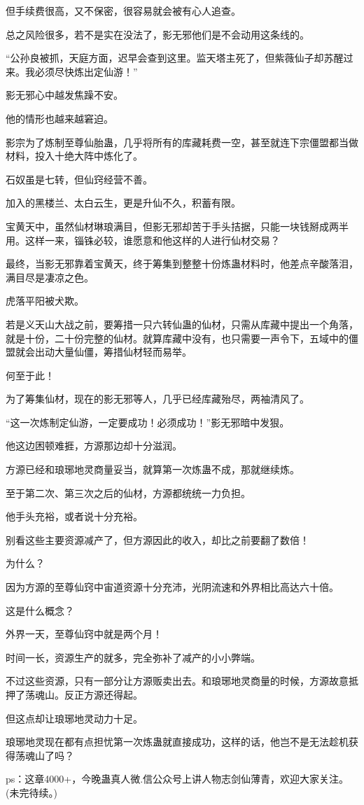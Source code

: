 \begin{this_body}
但手续费很高，又不保密，很容易就会被有心人追查。

总之风险很多，若不是实在没法了，影无邪他们是不会动用这条线的。

“公孙良被抓，天庭方面，迟早会查到这里。监天塔主死了，但紫薇仙子却苏醒过来。我必须尽快炼出定仙游！”

影无邪心中越发焦躁不安。

他的情形也越来越窘迫。

影宗为了炼制至尊仙胎蛊，几乎将所有的库藏耗费一空，甚至就连下宗僵盟都当做材料，投入十绝大阵中炼化了。

石奴虽是七转，但仙窍经营不善。

加入的黑楼兰、太白云生，更是升仙不久，积蓄有限。

宝黄天中，虽然仙材琳琅满目，但影无邪却苦于手头拮据，只能一块钱掰成两半用。这样一来，锱铢必较，谁愿意和他这样的人进行仙材交易？

最终，当影无邪靠着宝黄天，终于筹集到整整十份炼蛊材料时，他差点辛酸落泪，满目尽是凄凉之色。

虎落平阳被犬欺。

若是义天山大战之前，要筹措一只六转仙蛊的仙材，只需从库藏中提出一个角落，就是十份，二十份完整的仙材。就算库藏中没有，也只需要一声令下，五域中的僵盟就会出动大量仙僵，筹措仙材轻而易举。

何至于此！

为了筹集仙材，现在的影无邪等人，几乎已经库藏殆尽，两袖清风了。

“这一次炼制定仙游，一定要成功！必须成功！”影无邪暗中发狠。

他这边困顿难捱，方源那边却十分滋润。

方源已经和琅琊地灵商量妥当，就算第一次炼蛊不成，那就继续炼。

至于第二次、第三次之后的仙材，方源都统统一力负担。

他手头充裕，或者说十分充裕。

别看这些主要资源减产了，但方源因此的收入，却比之前要翻了数倍！

为什么？

因为方源的至尊仙窍中宙道资源十分充沛，光阴流速和外界相比高达六十倍。

这是什么概念？

外界一天，至尊仙窍中就是两个月！

时间一长，资源生产的就多，完全弥补了减产的小小弊端。

不过这些资源，只有一部分让方源贩卖出去。和琅琊地灵商量的时候，方源故意抵押了荡魂山。反正方源还得起。

但这点却让琅琊地灵动力十足。

琅琊地灵现在都有点担忧第一次炼蛊就直接成功，这样的话，他岂不是无法趁机获得荡魂山了吗？

ps：这章4000+，今晚蛊真人微.信公众号上讲人物志剑仙薄青，欢迎大家关注。(未完待续。)

\end{this_body}

